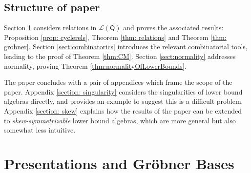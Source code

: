 \documentclass[10pt]{amsart}
\numberwithin{equation}{section}
\theoremstyle{definition}
\theoremstyle{remark}
\renewcommand{\L}{\mathcal{L}}%
\newcommand{\1}{^{-1}}
\def\Q{\mathsf{Q}}
\begin{document}
\subsection*{Structure of paper}

Section \ref{section: algebra} considers relations in $\L(\Q)$ and proves the associated results: Proposition \ref{prop: cyclerels}, Theorem \ref{thm: relations} and Theorem \ref{thm: grobner}.  Section \ref{sect:combinatorics} introduces the relevant combinatorial tools, leading to the proof of Theorem \ref{thm:CM}.  Section \ref{sect:normality} addresses normality, proving Theorem \ref{thm:normalityOfLowerBounds}.  

The paper concludes with a pair of appendices which frame the scope of the paper.  Appendix \ref{section: singularity} considers the singularities of lower bound algebras directly, and provides an example to suggest this is a difficult problem.  Appendix \ref{section: skew} explains how the results of the paper can be extended to \emph{skew-symmetrizable} lower bound algebras, which are more general but also somewhat less intuitive.

\section{Presentations and Gr\"obner Bases}\label{section: algebra}
\end{document}
